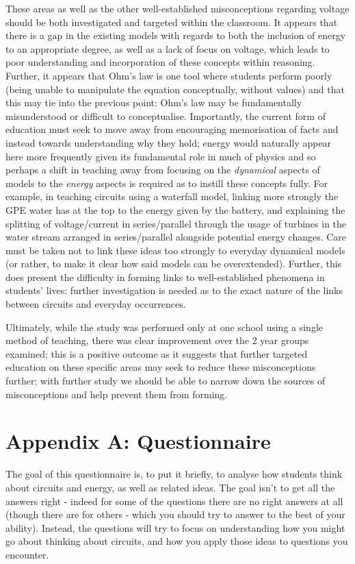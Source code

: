 \documentclass[a4paper,openany,nobib]{tufte-book}
\begin{document}
These areas as well as the other well-established misconceptions regarding voltage should be both investigated and targeted within the classroom. It appears that there is a gap in the existing models with regards to both the inclusion of energy to an appropriate degree, as well as a lack of focus on voltage, which leads to poor understanding and incorporation of these concepts within reasoning. Further, it appears that Ohm's law is one tool where students perform poorly (being unable to manipulate the equation conceptually, without values) and that this may tie into the previous point: Ohm's law may be fundamentally misunderstood or difficult to conceptualise.
Importantly, the current form of education must seek to move away from encouraging memorisation of facts and instead towards understanding why they hold; energy would naturally appear here more frequently given its fundamental role in much of physics and so perhaps a shift in teaching away from focusing on the \emph{dynamical} aspects of models to the \emph{energy} aspects is required as to instill these concepts fully. For example, in teaching circuits using a waterfall model, linking more strongly the GPE water has at the top to the energy given by the battery, and explaining the splitting of voltage/current in series/parallel through the usage of turbines in the water stream arranged in series/parallel alongside potential energy changes. Care must be taken not to link these ideas too strongly to everyday dynamical models (or rather, to make it clear how said models can be overextended).
Further, this does present the difficulty in forming links to well-established phenomena in students' lives: further investigation is needed as to the exact nature of the links between circuits and everyday occurrences.

Ultimately, while the study was performed only at one school using a single method of teaching, there was clear improvement over the 2 year groups examined; this is a positive outcome as it suggests that further targeted education on these specific areas may seek to reduce these misconceptions further; with further study we should be able to narrow down the sources of misconceptions and help prevent them from forming.
\backmatter
\chapter{Appendix A: Questionnaire}
The goal of this questionnaire is, to put it briefly, to analyse how students think about circuits and energy, as well as related ideas. The goal isn't to get all the answers right - indeed for some of the questions there are no right answers at all (though there are for others - which you should try to answer to the best of your ability). Instead, the questions will try to focus on understanding how you might go about thinking about circuits, and how you apply those ideas to questions you encounter.
\end{document}
